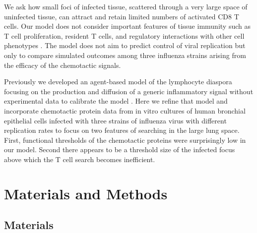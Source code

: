 \documentclass[10pt]{article}
\begin{document}
We ask how small foci of infected tissue, scattered through a very large space of uninfected tissue, can attract and retain limited numbers of activated CD8 T cells.  Our model does not consider important features of tissue immunity such as T cell proliferation, resident T cells, and regulatory interactions with other cell phenotypes \cite{McGill2009}.  The model does not aim to predict control of viral replication but only to compare simulated outcomes among three influenza strains arising from the efficacy of the chemotactic signals.  

Previously we developed an agent-based model of the lymphocyte diaspora focusing on the production and diffusion of a generic inflammatory signal without experimental data to calibrate the model \cite{Banerjee2011}.  Here we refine that model and incorporate chemotactic protein data from in vitro cultures of human bronchial epithelial cells infected with three strains of influenza virus with different replication rates \cite{Mitchell2011} to focus on two features of searching in the large lung space.  First, functional thresholds of the chemotactic proteins were surprisingly low in our model.  Second there appears to be a threshold size of the infected focus above which the T cell search becomes inefficient.

\section*{Materials and Methods}

\subsection*{Materials}
\end{document}
